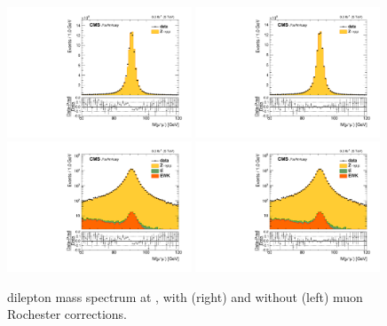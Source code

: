 \begin{figure}[htbp]
\centering
\includegraphics[width=0.49\textwidth]{plots/LepScaleSmear/plotZmm5TeV_noCorr/zmm.pdf}
\includegraphics[width=0.49\textwidth]{plots/LepScaleSmear/plotZmm5TeV_corr/zmm.pdf}
\\
\includegraphics[width=0.49\textwidth]{plots/LepScaleSmear/plotZmm5TeV_noCorr/zmmlog.pdf}
\includegraphics[width=0.49\textwidth]{plots/LepScaleSmear/plotZmm5TeV_corr/zmmlog.pdf}
\caption{\zmm dilepton mass spectrum at \serag, with (right) and without (left) muon Rochester corrections.}
\label{fig:lepscale:zmm:5}
\end{figure}